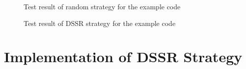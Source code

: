 \begin{figure}[H]
\centering
\setlength{\fboxsep}{0pt}%
\setlength{\fboxrule}{1pt}%
\bigskip
\caption{Test result of random strategy for the example code}
\label{fig:random_result}
\end{figure}

\bigskip
\bigskip

\begin{figure}[H]
\centering
\setlength{\fboxsep}{0pt}%
\setlength{\fboxrule}{1pt}%
\bigskip
\caption{Test result of DSSR strategy for the example code}
\label{fig:dssr_result}
\end{figure}




\section{Implementation of DSSR Strategy}\label{sec:imp}

